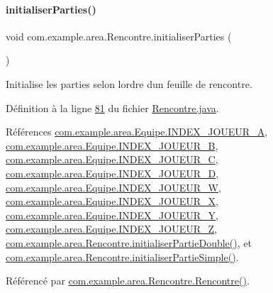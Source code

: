 \paragraph{\texorpdfstring{initialiser\+Parties()}{initialiserParties()}}
{\footnotesize\ttfamily void com.\+example.\+area.\+Rencontre.\+initialiser\+Parties (\begin{DoxyParamCaption}{ }\end{DoxyParamCaption})\hspace{0.3cm}{\ttfamily [private]}}



Initialise les parties selon l\textquotesingle{}ordre d\textquotesingle{}un feuille de rencontre. 



Définition à la ligne \hyperlink{_rencontre_8java_source_l00081}{81} du fichier \hyperlink{_rencontre_8java_source}{Rencontre.\+java}.



Références \hyperlink{_equipe_8java_source_l00015}{com.\+example.\+area.\+Equipe.\+I\+N\+D\+E\+X\+\_\+\+J\+O\+U\+E\+U\+R\+\_\+A}, \hyperlink{_equipe_8java_source_l00016}{com.\+example.\+area.\+Equipe.\+I\+N\+D\+E\+X\+\_\+\+J\+O\+U\+E\+U\+R\+\_\+B}, \hyperlink{_equipe_8java_source_l00017}{com.\+example.\+area.\+Equipe.\+I\+N\+D\+E\+X\+\_\+\+J\+O\+U\+E\+U\+R\+\_\+C}, \hyperlink{_equipe_8java_source_l00018}{com.\+example.\+area.\+Equipe.\+I\+N\+D\+E\+X\+\_\+\+J\+O\+U\+E\+U\+R\+\_\+D}, \hyperlink{_equipe_8java_source_l00020}{com.\+example.\+area.\+Equipe.\+I\+N\+D\+E\+X\+\_\+\+J\+O\+U\+E\+U\+R\+\_\+W}, \hyperlink{_equipe_8java_source_l00021}{com.\+example.\+area.\+Equipe.\+I\+N\+D\+E\+X\+\_\+\+J\+O\+U\+E\+U\+R\+\_\+X}, \hyperlink{_equipe_8java_source_l00022}{com.\+example.\+area.\+Equipe.\+I\+N\+D\+E\+X\+\_\+\+J\+O\+U\+E\+U\+R\+\_\+Y}, \hyperlink{_equipe_8java_source_l00023}{com.\+example.\+area.\+Equipe.\+I\+N\+D\+E\+X\+\_\+\+J\+O\+U\+E\+U\+R\+\_\+Z}, \hyperlink{_rencontre_8java_source_l00130}{com.\+example.\+area.\+Rencontre.\+initialiser\+Partie\+Double()}, et \hyperlink{_rencontre_8java_source_l00110}{com.\+example.\+area.\+Rencontre.\+initialiser\+Partie\+Simple()}.



Référencé par \hyperlink{_rencontre_8java_source_l00041}{com.\+example.\+area.\+Rencontre.\+Rencontre()}.


